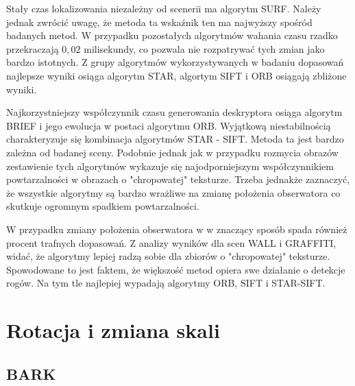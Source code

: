 Stały czas lokalizowania niezależny od scenerii ma algorytm SURF. Należy jednak zwrócić uwagę, że metoda ta wskaźnik ten ma najwyższy spośród badanych metod. W przypadku pozostałych algorytmów wahania czasu rzadko przekraczają $0,02$  milisekundy, co pozwala nie rozpatrywać tych zmian jako bardzo istotnych. Z grupy algorytmów wykorzystywanych w badaniu dopasowań najlepsze wyniki osiąga algorytm STAR, algortym SIFT i ORB osiągają zbliżone wyniki.

Najkorzystniejszy współczynnik czasu generowania deskryptora osiąga algorytm BRIEF i jego ewolucja w postaci algorytmu ORB. Wyjątkową niestabilnością charakteryzuje się kombinacja algorytmów STAR - SIFT. Metoda ta jest bardzo zależna od badanej sceny. Podobnie jednak jak w przypadku rozmycia obrazów zestawienie tych algorytmów wykazuje się najodporniejszym współczynnikiem powtarzalności w obrazach o "chropowatej" teksturze. Trzeba jednakże zaznaczyć, że wszystkie algorytmy są bardzo wrażliwe na zmianę położenia obserwatora co skutkuje ogromnym spadkiem powtarzalności.

W przypadku zmiany położenia obserwatora w w znaczący sposób spada również procent trafnych dopasowań. Z analizy wyników dla scen WALL i GRAFFITI, widać, że algorytmy lepiej radzą sobie dla zbiorów o "chropowatej" teksturze. Spowodowane to jest faktem, że większość metod opiera swe działanie o detekcje rogów. Na tym tle najlepiej wypadają algorytmy ORB, SIFT i STAR-SIFT.







\FloatBarrier

\section{Rotacja i zmiana skali}
\FloatBarrier
\subsection{BARK}

